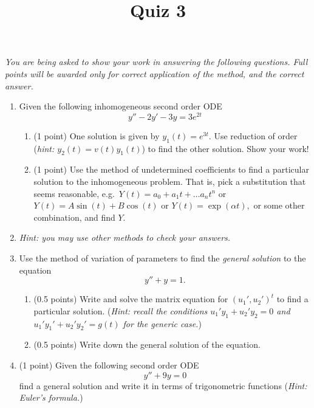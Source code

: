 \documentclass[10pt,a4paper]{article}
\title{Quiz 3}
\date{}
\begin{document}
\maketitle
\thispagestyle{fancy}
\noindent \emph{You are being asked to show your work in answering the following questions. Full points will be awarded only for correct application of the method, and the correct answer.}

\begin{enumerate}
\item Given the following inhomogeneous second order ODE
\[ y'' - 2y' - 3y = 3e^{2t} \]
\begin{enumerate}
\item (1 point) One solution is given by $y_1(t) = e^{3t}.$ Use reduction of order (\emph{hint: $y_2(t) = v(t) y_1(t)$}) to find the other solution. Show your work!
\item (1 point) Use the method of undetermined coefficients to find a particular solution to the inhomogeneous problem. That is, pick a substitution that seems reasonable, e.g.\ $Y(t) = a_0 + a_1t + \ldots a_n t^n$ or $Y(t) = A \sin(t) + B \cos(t)$ or $Y(t) = \exp(\alpha t),$ or some other combination, and find $Y.$ 
\end{enumerate}
\item[] \emph{Hint: you may use other methods to check your answers.}
\item Use the method of variation of parameters to find the \emph{general solution} to the equation 
\[ y'' + y = 1. \]
\begin{enumerate}
\item (0.5 points) Write and solve the matrix equation for $(u_1',u_2')^t$ to find a particular solution. (\emph{Hint: recall the conditions $u_1' y_1 + u_2' y_2 = 0$ and $u_1'y_1' + u_2'y_2' = g(t)$ for the generic case.})
\item (0.5 points) Write down the general solution of the equation.
\end{enumerate}
\item (1 point) Given the following second order ODE
\[ y'' + 9 y = 0 \]
find a general solution and write it in terms of trigonometric functions (\emph{Hint: Euler's formula.})
\end{enumerate}
\end{document}
